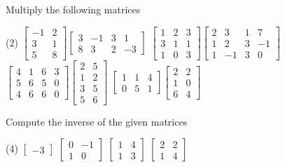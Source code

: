 \begin{exercise}
Multiply the following matrices
\begin{tasks}(2)
\task
$\begin{bmatrix}
-1 & 2 \\
3 & 1 \\
5 & 8
\end{bmatrix}
\begin{bmatrix}
3 & -1 & 3 & 1 \\
8 & 3 & 2 & -3
\end{bmatrix}$
\task
$\begin{bmatrix}
1 & 2 & 3 \\
3 & 1 & 1 \\
1 & 0 & 3
\end{bmatrix}
\begin{bmatrix}
2 & 3 & 1 & 7 \\
1 & 2 & 3 & -1 \\
1 & -1 & 3 & 0
\end{bmatrix}$
\task
$\begin{bmatrix}
4 & 1 & 6 & 3 \\
5 & 6 & 5 & 0 \\
4 & 6 & 6 & 0
\end{bmatrix}
\begin{bmatrix}
2 & 5 \\
1 & 2 \\
3 & 5 \\
5 & 6
\end{bmatrix}$
\task
$\begin{bmatrix}
1 & 1 & 4 \\
0 & 5 & 1
\end{bmatrix}
\begin{bmatrix}
2 & 2 \\
1 & 0 \\
6 & 4
\end{bmatrix}$
\end{tasks}
\end{exercise}

\begin{exercise}
Compute the inverse of the given matrices
\begin{tasks}(4)
\task
$\begin{bmatrix}
-3
\end{bmatrix}$
\task
$\begin{bmatrix}
0 & -1 \\
1 & 0
\end{bmatrix}$
\task
$\begin{bmatrix}
1 & 4 \\
1 & 3
\end{bmatrix}$
\task
$\begin{bmatrix}
2 & 2 \\
1 & 4
\end{bmatrix}$
\end{tasks}
\end{exercise}

